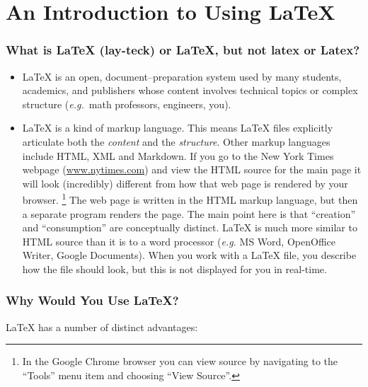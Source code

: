 \part{An Introduction to Using \LaTeX{}}

\section{What is \LaTeX{} (lay-teck) or LaTeX, but not latex or Latex?}

\begin{itemize}

\item \LaTeX{} is an open, document--preparation system used by many students,
  academics, and publishers whose content involves technical topics or complex
  structure (\textit{e.g.}\ math professors, engineers, you).

\item \LaTeX{} is a kind of markup language. This means \LaTeX{} files
  explicitly articulate both the \textit{content} and the
  \textit{structure}. Other markup languages include HTML, XML and Markdown. If
  you go to the New York Times webpage (\url{www.nytimes.com}) and view the HTML
  source for the main page it will look (incredibly) different from how that web
  page is rendered by your browser. \footnote{In the Google Chrome browser you
    can view source by navigating to the ``Tools'' menu item and choosing ``View
    Source''.} The web page is written in the HTML markup language, but then a
  separate program renders the page. The main point here is that ``creation''
  and ``consumption'' are conceptually distinct. LaTeX{} is much more similar to
  HTML source than it is to a word processor (\textit{e.g.}  MS Word, OpenOffice
  Writer, Google Documents). When you work with a \LaTeX{} file, you describe
  how the file should look, but this is not displayed for you in real-time.
\end{itemize}

\section{Why Would You Use \LaTeX{}?}

\LaTeX{} has a number of distinct advantages:

